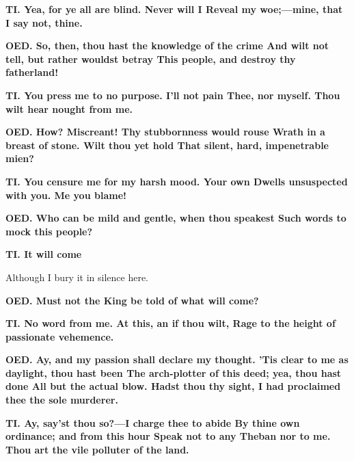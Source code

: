 \documentclass[11pt,letter]{book}
\begin{document}
\par \textbf{TI. Yea, for ye all are blind. Never will I Reveal my woe;—mine, that I say not, thine.}
\par 

\par \textbf{OED. So, then, thou hast the knowledge of the crime And wilt not tell, but rather wouldst betray This people, and destroy thy fatherland!}
\par 

\par \textbf{TI. You press me to no purpose. I’ll not pain Thee, nor myself. Thou wilt hear nought from me.}
\par 

\par \textbf{OED. How? Miscreant! Thy stubbornness would rouse Wrath in a breast of stone. Wilt thou yet hold That silent, hard, impenetrable mien?}
\par 

\par \textbf{TI. You censure me for my harsh mood. Your own Dwells unsuspected with you. Me you blame!}
\par 

\par \textbf{OED. Who can be mild and gentle, when thou speakest Such words to mock this people?}
\par 

\par \textbf{TI. It will come}
\par   Although I bury it in silence here.

\par \textbf{OED. Must not the King be told of what will come?}
\par 

\par \textbf{TI. No word from me. At this, an if thou wilt, Rage to the height of passionate vehemence.}
\par 

\par \textbf{OED. Ay, and my passion shall declare my thought. ’Tis clear to me as daylight, thou hast been The arch-plotter of this deed; yea, thou hast done All but the actual blow. Hadst thou thy sight, I had proclaimed thee the sole murderer.}
\par 

\par \textbf{TI. Ay, say’st thou so?—I charge thee to abide By thine own ordinance; and from this hour Speak not to any Theban nor to me. Thou art the vile polluter of the land.}
\par 
\end{document}
